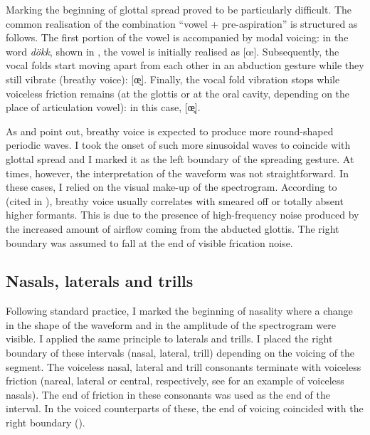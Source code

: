 \documentclass[11pt,a4paper,openany]{memoir}\usepackage[]{graphicx}\usepackage[]{color}
\begin{document}
Marking the beginning of glottal spread proved to be particularly difficult.
The common realisation of the combination ``vowel + pre-aspiration'' is structured as follows.
The first portion of the vowel is accompanied by modal voicing: in the word \textit{dökk}, shown in , the vowel is initially realised as [œ].
Subsequently, the vocal folds start moving apart from each other in an abduction gesture while they still vibrate (breathy voice): [œ̤].
Finally, the vocal fold vibration stops while voiceless friction remains (at the glottis or at the oral cavity, depending on the place of articulation vowel): in this case, [œ̥].

As \citet{khan2012} and \citet{nance2013} point out, breathy voice is expected to produce more round-shaped periodic waves.
I took the onset of such more sinusoidal waves to coincide with glottal spread and I marked it as the left boundary of the spreading gesture.
At times, however, the interpretation of the waveform was not straightforward.
In these cases, I relied on the visual make-up of the spectrogram.
According to \citealt{jones2006} (cited in \citealt[134]{nance2013}), breathy voice usually correlates with smeared off or totally absent higher formants.
This is due to the presence of high-frequency noise produced by the increased amount of airflow coming from the abducted glottis.
The right boundary was assumed to fall at the end of visible frication noise.

\subsection{Nasals, laterals and trills}

Following standard practice, I marked the beginning of nasality where a change in the shape of the waveform and in the amplitude of the spectrogram were visible.
I applied the same principle to laterals and trills.
I placed the right boundary of these intervals (nasal, lateral, trill) depending on the voicing of the segment.
The voiceless nasal, lateral and trill consonants terminate with voiceless friction (nareal, lateral or central, respectively, see  for an example of voiceless nasals).
The end of friction in these consonants was used as the end of the interval.
In the voiced counterparts of these, the end of voicing coincided with the right boundary ().
\end{document}
